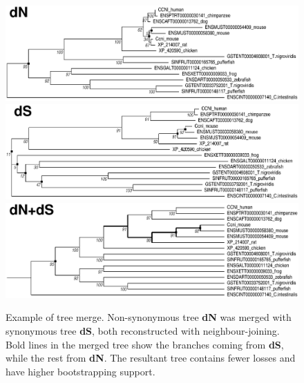 \begin{figure}[!hb]
\includegraphics[width=\textwidth]{CCNI-dn}\\
\includegraphics[width=\textwidth]{CCNI-ds}\\
\includegraphics[width=\textwidth]{CCNI-dm}
\caption[Example of tree merge]{Example of tree merge. Non-synonymous tree {\bf dN}
	was merged with synonymous tree {\bf dS}, both reconstructed with neighbour-joining.
	Bold lines in the merged tree show the branches
	coming from {\bf dS}, while the rest from {\bf dN}. The resultant tree contains
	fewer losses and have higher bootstrapping support.	}\label{fig:mergeexam2}
\end{figure}

